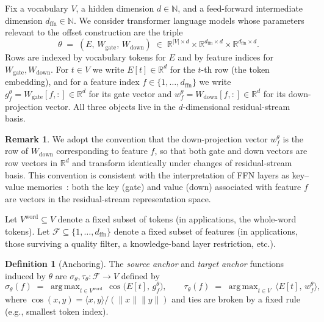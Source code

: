 \documentclass[11pt,letterpaper]{article}
\theoremstyle{definition}
\newtheorem{definition}[theorem]{Definition}
\newtheorem{remark}[theorem]{Remark}
\DeclareMathOperator*{\argmax}{arg\,max}
\DeclareMathOperator{\cossim}{cos}
\begin{document}
Fix a vocabulary $V$, a hidden dimension $d \in \mathbb{N}$, and a feed-forward intermediate dimension $d_{\mathrm{ffn}} \in \mathbb{N}$. We consider transformer language models whose parameters relevant to the offset construction are the triple
\[
\theta \;=\; (E, \, W_{\mathrm{gate}}, \, W_{\mathrm{down}}) \;\in\; \mathbb{R}^{|V| \times d} \times \mathbb{R}^{d_{\mathrm{ffn}} \times d} \times \mathbb{R}^{d_{\mathrm{ffn}} \times d}.
\]
Rows are indexed by vocabulary tokens for $E$ and by feature indices for $W_{\mathrm{gate}}, W_{\mathrm{down}}$. For $t \in V$ we write $E[t] \in \mathbb{R}^d$ for the $t$-th row (the token embedding), and for a feature index $f \in \{1, \ldots, d_{\mathrm{ffn}}\}$ we write $g_f^\theta = W_{\mathrm{gate}}[f, :] \in \mathbb{R}^d$ for its gate vector and $w_f^\theta = W_{\mathrm{down}}[f, :] \in \mathbb{R}^d$ for its down-projection vector. All three objects live in the $d$-dimensional residual-stream basis.

\begin{remark}
We adopt the convention that the down-projection vector $w_f^\theta$ is the row of $W_{\mathrm{down}}$ corresponding to feature $f$, so that both gate and down vectors are row vectors in $\mathbb{R}^d$ and transform identically under changes of residual-stream basis. This convention is consistent with the interpretation of FFN layers as key--value memories~\citep{geva_2021,geva_2022}: both the key (gate) and value (down) associated with feature $f$ are vectors in the residual-stream representation space.
\end{remark}

Let $V^{\mathrm{word}} \subseteq V$ denote a fixed subset of tokens (in applications, the whole-word tokens). Let $\mathcal{F} \subseteq \{1, \ldots, d_{\mathrm{ffn}}\}$ denote a fixed subset of features (in applications, those surviving a quality filter, a knowledge-band layer restriction, etc.).

\begin{definition}[Anchoring]
\label{def:anchoring}
The \emph{source anchor} and \emph{target anchor} functions induced by $\theta$ are $\sigma_\theta, \tau_\theta : \mathcal{F} \to V$ defined by
\[
\sigma_\theta(f) \;=\; \argmax_{t \in V^{\mathrm{word}}} \, \cossim\!\big( E[t], \, g_f^\theta \big), \qquad
\tau_\theta(f) \;=\; \argmax_{t \in V} \, \big\langle E[t], \, w_f^\theta \big\rangle,
\]
where $\cossim(x, y) = \langle x, y \rangle / (\|x\|\|y\|)$ and ties are broken by a fixed rule (e.g., smallest token index).
\end{definition}
\end{document}
